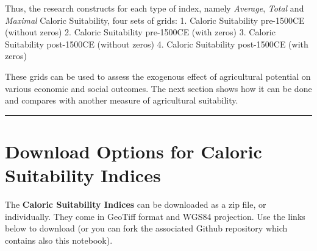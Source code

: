 \documentclass{article}
\begin{document}
Thus, the research constructs for each type of index, namely
\emph{Average}, \emph{Total} and \emph{Maximal} Caloric Suitability,
four sets of grids: 1. Caloric Suitability pre-1500CE (without zeros) 2.
Caloric Suitability pre-1500CE (with zeros) 3. Caloric Suitability
post-1500CE (without zeros) 4. Caloric Suitability post-1500CE (with
zeros)

These grids can be used to assess the exogenous effect of agricultural
potential on various economic and social outcomes. The next section
shows how it can be done and compares with another measure of
agricultural suitability.

\begin{center}\rule{0.5\linewidth}{\linethickness}\end{center}

    \section{Download Options for Caloric Suitability
Indices}\label{download-options-for-caloric-suitability-indices}

    The \textbf{Caloric Suitability Indices} can be downloaded as a zip
file, or individually. They come in GeoTiff format and WGS84 projection.
Use the links below to download (or you can fork the associated Github
repository which contains also this notebook).
\end{document}
